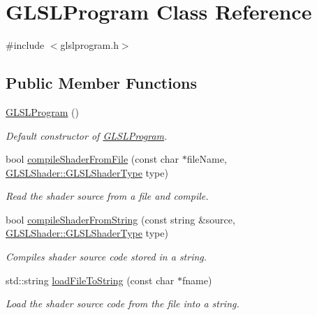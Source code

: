 \hypertarget{class_g_l_s_l_program}{}\section{G\+L\+S\+L\+Program Class Reference}
\label{class_g_l_s_l_program}


{\ttfamily \#include $<$glslprogram.\+h$>$}

\subsection*{Public Member Functions}
\begin{DoxyCompactItemize}
\item 
\hyperlink{class_g_l_s_l_program_a9a93ab534634ee4abfda2f216008e553}{G\+L\+S\+L\+Program} ()
\begin{DoxyCompactList}\small\item\em Default constructor of \hyperlink{class_g_l_s_l_program}{G\+L\+S\+L\+Program}. \end{DoxyCompactList}\item 
bool \hyperlink{class_g_l_s_l_program_a31f24024046d5ed7646d0c53df4898dc}{compile\+Shader\+From\+File} (const char $\ast$file\+Name, \hyperlink{namespace_g_l_s_l_shader_a5da03bdfde28d414fcf090182b3b8177}{G\+L\+S\+L\+Shader\+::\+G\+L\+S\+L\+Shader\+Type} type)
\begin{DoxyCompactList}\small\item\em Read the shader source from a file and compile. \end{DoxyCompactList}\item 
bool \hyperlink{class_g_l_s_l_program_a428c7ce6d50b7100d06c621e6647dda8}{compile\+Shader\+From\+String} (const string \&source, \hyperlink{namespace_g_l_s_l_shader_a5da03bdfde28d414fcf090182b3b8177}{G\+L\+S\+L\+Shader\+::\+G\+L\+S\+L\+Shader\+Type} type)
\begin{DoxyCompactList}\small\item\em Compiles shader source code stored in a string. \end{DoxyCompactList}\item 
std\+::string \hyperlink{class_g_l_s_l_program_afc8f73c15d9696c49783b86a187123be}{load\+File\+To\+String} (const char $\ast$fname)
\begin{DoxyCompactList}\small\item\em Load the shader source code from the file into a string. \end{DoxyCompactList}\item 

\end{DoxyCompactItemize}
